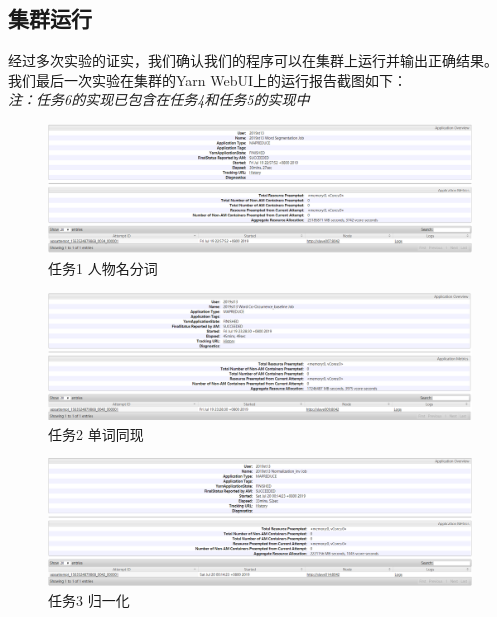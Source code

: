 \subsection{集群运行}
经过多次实验的证实，我们确认我们的程序可以在集群上运行并输出正确结果。
我们最后一次实验在集群的Yarn WebUI上的运行报告截图如下：
\\
\emph{注：任务6的实现已包含在任务4和任务5的实现中}
\begin{figure}[htbp]
	\centering
	\includegraphics[scale=0.35]{figures/task1.PNG}
	\caption{任务1 人物名分词}
\end{figure}
\begin{figure}[htbp]
	\centering
	\includegraphics[scale=0.35]{figures/task2.PNG}
	\caption{任务2 单词同现}
\end{figure}
\begin{figure}[htbp]
	\centering
	\includegraphics[scale=0.35]{figures/task3.PNG}
	\caption{任务3 归一化}
\end{figure}
